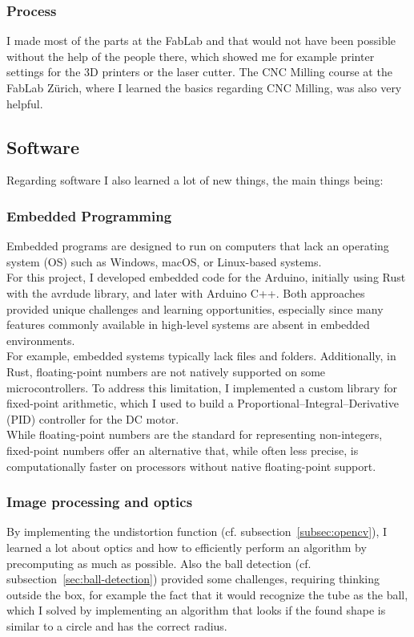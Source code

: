 \subsubsection{Process}
I made most of the parts at the FabLab and that would not have been possible without the help of the people there, which showed me for example printer settings for the 3D printers or the laser cutter.
The CNC Milling course at the FabLab Zürich, where I learned the basics regarding CNC Milling, was also very helpful.

\subsection{Software}\label{subsec:software}
Regarding software I also learned a lot of new things, the main things being:

\subsubsection{Embedded Programming}\label{subsubsec:embedded}
Embedded programs are designed to run on computers that lack an operating system (OS) such as Windows\autocite{windows}, macOS\autocite{macos}, or Linux-based systems\autocite{linux}.\autocite{embedded-software}\\
For this project, I developed embedded code for the Arduino, initially using Rust\autocite{rust} with the avrdude library\autocite{avrdude}, and later with Arduino C++\autocite{arduino-c++}.
Both approaches provided unique challenges and learning opportunities, especially since many features commonly available in high-level systems are absent in embedded environments.\\
For example, embedded systems typically lack files and folders.
Additionally, in Rust, floating-point numbers are not natively supported on some microcontrollers.
To address this limitation, I implemented a custom library for fixed-point arithmetic, which I used to build a Proportional–Integral–Derivative (PID) controller\autocite{pid} for the DC motor.\\
While floating-point numbers\autocite{floating-point} are the standard for representing non-integers, fixed-point numbers\autocite{fixed-point} offer an alternative that, while often less precise, is computationally faster on processors without native floating-point support.

\subsubsection{Image processing and optics}
By implementing the undistortion function (cf.
subsection~\ref{subsec:opencv}), I learned a lot about optics and how to efficiently perform an algorithm by precomputing as much as possible.
Also the ball detection (cf.
subsection~\ref{sec:ball-detection}) provided some challenges, requiring thinking outside the box, for example the fact that it would recognize the tube as the ball, which I solved by implementing an algorithm that looks if the found shape is similar to a circle and has the correct radius.

